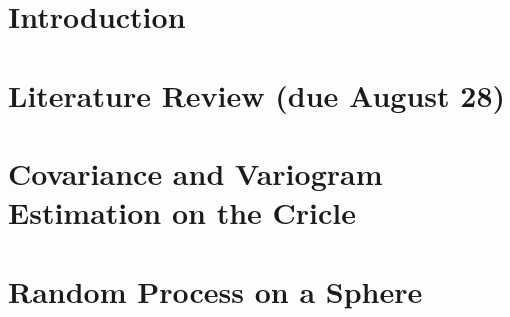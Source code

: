 \documentclass[phd]{uncgdissertation}
\begin{document}
\tableofcontents %


\listoftables   


\listoffigures   


\mainmatter %


\chapter{Introduction}


\chapter{Literature Review (due August 28)}
%


\chapter{Covariance and Variogram Estimation on the Cricle}


\chapter{Random Process on a Sphere}


\end{document}
